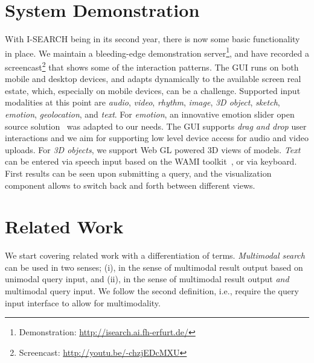\documentclass{acm_proc_article-sp}
\let\oldemph\emph
\renewcommand{\emph}[1]{\oldemph{\fontsize{9}{9}\selectfont #1}}
\newcommand{\inlinelistingsize}{\fontsize{8pt}{11pt}}
\let\oldurl\url
\renewcommand{\url}[1]{\inlinelistingsize\oldurl{#1}}
\begin{document}
\section{System Demonstration} \label{sec:systemdemonstration}
With \mbox{I-SEARCH} being in its second year, there is now some basic functionality in place.
We maintain a bleeding-edge demonstration server\footnote{Demonstration: \url{http://isearch.ai.fh-erfurt.de/}}, and have recorded a screencast\footnote{Screencast: \url{http://youtu.be/-chzjEDcMXU}} that shows some of the interaction patterns.
The GUI runs on both mobile and desktop devices, and adapts dynamically to the available screen real estate, which, especially on mobile devices, can be a challenge.
Supported input modalities at this point are \emph{audio}, \emph{video}, \emph{rhythm}, \emph{image}, \emph{3D object}, \emph{sketch}, \emph{emotion}, \emph{geolocation}, and \emph{text}.
For \emph{emotion}, an innovative emotion slider open source solution~\cite{emotionslider} was adapted to our needs.
The GUI supports \textit{drag and drop} user interactions and we aim for supporting low level device access for audio and video uploads.
For \emph{3D objects}, we support Web GL powered 3D views of models.
\emph{Text} can be entered via speech input based on the WAMI toolkit~\cite{wami}, or via keyboard.
First results can be seen upon submitting a query, and the visualization component allows to switch back and forth between different views.

\section{Related Work} \label{sec:relatedwork}
We start covering related work with a differentiation of terms.
\emph{Multimodal search} can be used in two senses; (i), in the sense of multimodal result output based on unimodal query input, and (ii), in the sense of multimodal result output \emph{and} multimodal query input.
We follow the second definition, i.e., require the query input interface to allow for multimodality.
\end{document}
